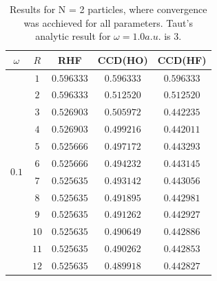 \documentclass[
    a4paper, aps, twocolumn, floatfix, superscriptaddress,
    nofootinbib]{revtex4-1}
\newcommand{\1}{\mathds{1}}
\begin{document}
        \begin{table}
            \centering
            \caption{Results for N = 2 particles, where convergence was 
                acchieved for all parameters. Taut's\cite{taut1994two}
                analytic result for $\omega=1.0a.u.$ is $3$.}
            \begin{ruledtabular}
                \begin{tabular}{c|c|ccc}
                    $\omega$ & $R$ & RHF & CCD(HO) & CCD(HF) \\
                    \hline
                               &  $1$  & $0.596333$ & $0.596333$ & $0.596333$ \\
                               &  $2$  & $0.596333$ & $0.512520$ & $0.512520$ \\
                               &  $3$  & $0.526903$ & $0.505972$ & $0.442235$ \\
                               &  $4$  & $0.526903$ & $0.499216$ & $0.442011$ \\
                               &  $5$  & $0.525666$ & $0.497172$ & $0.443293$ \\
        \multirow{2}{*}{$0.1$} &  $6$  & $0.525666$ & $0.494232$ & $0.443145$ \\
                               &  $7$  & $0.525635$ & $0.493142$ & $0.443056$ \\
                               &  $8$  & $0.525635$ & $0.491895$ & $0.442981$ \\
                               &  $9$  & $0.525635$ & $0.491262$ & $0.442927$ \\
                               &  $10$ & $0.525635$ & $0.490649$ & $0.442886$ \\
                               &  $11$ & $0.525635$ & $0.490262$ & $0.442853$ \\
                               &  $12$ & $0.525635$ & $0.489918$ & $0.442827$ \\
                    \hline


\end{tabular}
\end{ruledtabular}
\end{table}
\end{document}
